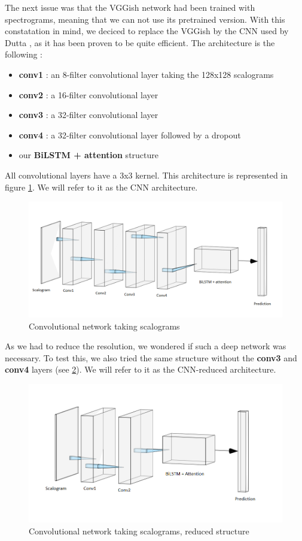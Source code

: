 \documentclass[final]{cvpr}
\begin{document}
The next issue was that the VGGish network had been trained with spectrograms, meaning that we can not use its pretrained version. With this constatation in mind, we deciced to replace the VGGish by the CNN used by Dutta \etal, as it has been proven to be quite efficient. The architecture is the following :
\begin{itemize}
	\item \textbf{conv1} : an 8-filter convolutional layer taking the 128x128 scalograms
	\item \textbf{conv2} : a 16-filter convolutional layer
	\item \textbf{conv3} : a 32-filter convolutional layer
	\item \textbf{conv4} : a 32-filter convolutional layer followed by a dropout
	\item our \textbf{BiLSTM + attention} structure
\end{itemize}
All convolutional layers have a 3x3 kernel. This architecture is represented in figure \ref{cnn}. We will refer to it as the CNN architecture.
\begin{figure}
	\centering
	\includegraphics[scale = 0.65]{cnn.png}
	\caption{Convolutional network taking scalograms}
	\label{cnn}
\end{figure}
As we had to reduce the resolution, we wondered if such a deep network was necessary. To test this, we also tried the same structure without the \textbf{conv3} and \textbf{conv4} layers (see \ref{reduit}). We will refer to it as the CNN-reduced architecture.
\begin{figure}
	\centering
	\includegraphics[scale = 0.45]{cnnreduit.png}
	\caption{Convolutional network taking scalograms, reduced structure}
	\label{reduit}
\end{figure}
\end{document}
